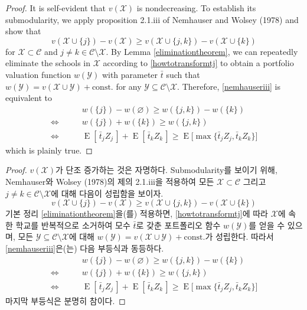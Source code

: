 \documentclass[11pt]{article} %
\theoremstyle{definition}
\theoremstyle{definition}
\begin{document}
\ifen
\begin{proof}
It is self-evident that $v(\mathcal{X})$ is nondecreasing. To establish its submodularity, we apply proposition 2.1.iii of Nemhauser and Wolsey (1978) and show that
\begin{equation}\label{nemhauseriii}
v(\mathcal{X} \cup \{j\}) - v(\mathcal{X}) \geq 
v(\mathcal{X} \cup \{j, k\}) - v(\mathcal{X} \cup \{k\})
\end{equation}
for $\mathcal{X} \subset \mathcal{C}$ and $j \neq k \in \mathcal{C} \setminus \mathcal{X}$. By Lemma \ref{eliminationtheorem}, we can repeatedly eliminate the schools in $\mathcal{X}$ according to \eqref{howtotransformtj} to obtain a portfolio valuation function $w(\mathcal{Y})$ with parameter $\bar t$ such that $w(\mathcal{Y}) = v(\mathcal{X} \cup \mathcal{Y}) + \text{const.}$ for any $\mathcal{Y} \subseteq \mathcal{C} \setminus \mathcal{X}$. Therefore, \eqref{nemhauseriii} is equivalent to
\begin{align}
& w(\{j\}) - w(\varnothing) \geq w(\{j, k\}) - w(\{k\}) \\
\iff \qquad &w(\{j\})  +  w(\{k\})  \geq w(\{j, k\})  \\
\iff \qquad &\operatorname{E}[\,\bar t_j Z_j\,] + \operatorname{E}[\,\bar t_k Z_k\,] 
\geq \operatorname{E}\bigl[\max\{ \bar t_j Z_j, \bar t_k Z_k \} \bigr]
\end{align}
which is plainly true. 
\end{proof}
\else
\begin{proof}
$v(\mathcal{X})$가 단조 증가하는 것은 자명하다. Submodularity를 보이기 위해, Nemhauser와 Wolsey (1978)의 제의 2.1.iii을 적용하여 모든 $\mathcal{X} \subset \mathcal{C}$ 그리고 $j \neq k \in \mathcal{C} \setminus \mathcal{X}$에 대해 다음이 성립함을 보이자.
\begin{equation}\label{nemhauseriii}
v(\mathcal{X} \cup \{j\}) - v(\mathcal{X}) \geq 
v(\mathcal{X} \cup \{j, k\}) - v(\mathcal{X} \cup \{k\})
\end{equation}
기본 정리 \ref{eliminationtheorem}을(를) 적용하면, \eqref{howtotransformtj}에 따라 $\mathcal{X}$에 속한 학교를 반복적으로 소거하여 모수 $\bar t$로 갖춘 포트폴리오 함수 $w(\mathcal{Y})$를 얻을 수 있으며,  모든 $\mathcal{Y} \subseteq \mathcal{C} \setminus \mathcal{X}$에 대해 $w(\mathcal{Y}) = v(\mathcal{X} \cup \mathcal{Y}) + \text{const.}$가 성립한다. 따라서 \eqref{nemhauseriii}은(는) 다음 부등식과 동등하다.
\begin{align}
& w(\{j\}) - w(\varnothing) \geq w(\{j, k\}) - w(\{k\}) \\
\iff \qquad &w(\{j\})  +  w(\{k\})  \geq w(\{j, k\})  \\
\iff \qquad &\operatorname{E}[\,\bar t_j Z_j\,] + \operatorname{E}[\,\bar t_k Z_k\,] 
\geq \operatorname{E}\bigl[\max\{ \bar t_j Z_j, \bar t_k Z_k \} \bigr]
\end{align}
마지막 부등식은 분명히 참이다.
\end{proof}
\fi
\end{document}
